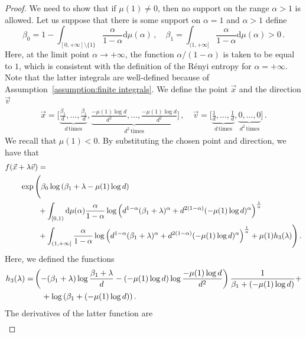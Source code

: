 \documentclass[aps,pra,11pt,onecolumn,nofootinbib,tightenlines]{revtex4-2}
\theoremstyle{definition}
\def \d {\mathrm{d}}
\begin{document}
\begin{proof}
    \bigskip
We need to show that if $\mu(1) \neq 0$, then no support on the range $\alpha>1$ is allowed. Let us suppose that there is some support on $\alpha=1$ and $\alpha>1$ define
\begin{equation}
    \beta_0 = 1- \int_{[0,+\infty]\setminus\{1\}} \frac{\alpha}{1-\alpha}\d\mu(\alpha) \,,  \quad \beta_1 = \int_{(1,+\infty]} \frac{\alpha}{1-\alpha}\d\mu(\alpha) > 0 \,.
\end{equation}
Here, at the limit point $\alpha \to +\infty$, the function $\alpha/(1-\alpha)$ is taken to be equal to $1$, which is consistent with the definition of the Rényi entropy for $\alpha=+\infty$.
Note that the latter integrals are well-defined because of Assumption~\ref{assumption:finite integrals}.
We define the point $\vec{x}$ and the direction $\vec{v}$
\begin{align}
\vec{x}=\bigg[\underbrace{\frac{\beta_1}{d},\ldots,\frac{\beta_1}{d}}_{d\,\textrm{times}},\underbrace{\frac{-\mu(1)\log{d}}{d^2},\ldots,\frac{-\mu(1)\log{d}}{d^2}}_{d^2\,\textrm{times}}\bigg] \,,
\quad 
\vec{v}=\bigg[\underbrace{\frac{1}{d},\ldots,\frac{1}{d}}_{d\,\textrm{times}},\underbrace{0,\ldots,0}_{d^2\,\textrm{times}}\bigg] \,.
\end{align}
We recall that $\mu(1)<0$. By substituting the chosen point and direction, we have that
\begin{align}
&f(\vec{x}+\lambda\vec{v}) =\notag\\
&\qquad \exp\Bigg(\beta_0\log{(\beta_1+\lambda-\mu(1)\log{d})}\notag\\
&\qquad\qquad\; +\int_{[0,1)}\d \mu(\alpha)\frac{\alpha}{1-\alpha}\log{\left(d^{1-\alpha}(\beta_1+\lambda)^\alpha+d^{2(1-\alpha)}(-\mu(1)\log{d})^\alpha\right)^\frac{1}{\alpha}} \notag \\
&\quad\qquad\quad\;+\int_{(1,+\infty]}\frac{\alpha}{1-\alpha}\log{\left(d^{1-\alpha}(\beta_1+\lambda)^\alpha+d^{2(1-\alpha)}(-\mu(1)\log{d})^\alpha\right)^\frac{1}{\alpha}} +\mu(1) h_3(\lambda) \Bigg) \,.
\end{align}
Here, we defined the functions
\begin{align}
    h_3(\lambda) =& \left(-(\beta_1+\lambda) \log{\frac{\beta_1+\lambda}{d}}-(-\mu(1)\log{d})\log{\frac{-\mu(1)\log{d}}{d^2}} \right) \frac{1}{\beta_1+(-\mu(1)\log{d})} + \notag\\
    &\quad +\log{(\beta_1+(-\mu(1)\log{d}))}\,.
\end{align}
The derivatives of the latter function are
\begin{align}

\end{align}
\end{proof}
\end{document}
